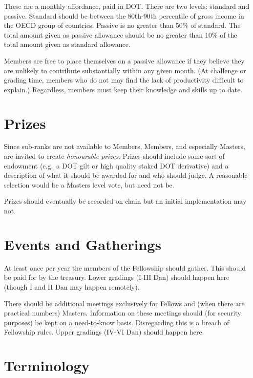 \documentclass[9pt,oneside]{amsart}
\begin{document}
These are a monthly affordance, paid in DOT. There are two levels: standard and passive. Standard should be between the 80th-90th percentile of gross income in the OECD group of countries. Passive is no greater than 50\% of standard. The total amount given as passive allowance should be no greater than 10\% of the total amount given as standard allowance.

Members are free to place themselves on a passive allowance if they believe they are unlikely to contribute substantially within any given month. (At challenge or grading time, members who do not may find the lack of productivity difficult to explain.) Regardless, members must keep their knowledge and skills up to date.

\section{Prizes}\label{prizes}

Since sub-ranks are not available to Members, Members, and especially Masters, are invited to create \emph{honourable prizes}. Prizes should include some sort of endowment (e.g.~a DOT gilt or high quality staked DOT derivative) and a description of what it should be awarded for and who should judge. A reasonable selection would be a Masters level vote, but need not be.

Prizes should eventually be recorded on-chain but an initial implementation may not.

\section{Events and Gatherings}\label{events-and-gatherings}

At least once per year the members of the Fellowship should gather. This should be paid for by the treasury. Lower gradings (I-III Dan) should happen here (though I and II Dan may happen remotely).

There should be additional meetings exclusively for Fellows and (when there are practical numbers) Masters. Information on these meetings should (for security purposes) be kept on a need-to-know basis. Disregarding this is a breach of Fellowship rules. Upper gradings (IV-VI Dan) should happen here.

{}


\appendix

\section{Terminology}\label{terminology}
\end{document}
